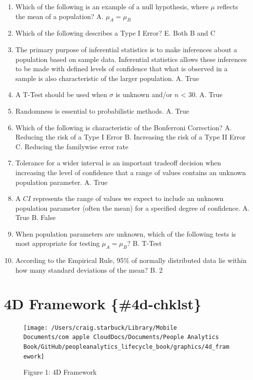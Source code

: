 \documentclass[]{book}
\begin{document}
\begin{enumerate}
\def\labelenumi{\arabic{enumi}.}
\item
  Which of the following is an example of a null hypothesis, where \(\mu\) reflects the mean of a population?
  A. \(\mu_A = \mu_B\)
\item
  Which of the following describes a Type I Error?
  E. Both B and C
\item
  The primary purpose of inferential statistics is to make inferences about a population based on sample data. Inferential statistics allows these inferences to be made with defined levels of confidence that what is observed in a sample is also characteristic of the larger population.
  A. True
\item
  A T-Test should be used when \(\sigma\) is unknown and/or \(n\) \textless{} 30.
  A. True
\item
  Randomness is essential to probabilistic methods.
  A. True
\item
  Which of the following is characteristic of the Bonferroni Correction?
  A. Reducing the risk of a Type I Error
  B. Increasing the risk of a Type II Error
  C. Reducing the familywise error rate
\item
  Tolerance for a wider interval is an important tradeoff decision when increasing the level of confidence that a range of values contains an unknown population parameter.
  A. True
\item
  A \(CI\) represents the range of values we expect to include an unknown population parameter (often the mean) for a specified degree of confidence.
  A. True
  B. False
\item
  When population parameters are unknown, which of the following tests is most appropriate for testing \(\mu_A = \mu_B\)?
  B. T-Test
\item
  According to the Empirical Rule, 95\% of normally distributed data lie within how many standard deviations of the mean?
  B. 2
\end{enumerate}

\hypertarget{d-framework-4d-chklst}{%
\section{4D Framework \{\#4d-chklst\}}\label{d-framework-4d-chklst}}

\begin{figure}
\texttt{[image: /Users/craig.starbuck/Library/Mobile Documents/com~apple~CloudDocs/Documents/People Analytics Book/GitHub/peopleanalytics\_lifecycle\_book/graphics/4d\_framework]} \caption{Figure 1: 4D Framework}\label{fig:4d-overview}
\end{figure}
\end{document}

